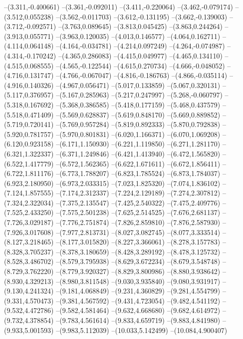 --(3.311,-0.400661)
--(3.361,-0.092011)
--(3.411,-0.220064)
--(3.462,-0.079174)
--(3.512,0.055238)
--(3.562,-0.011703)
--(3.612,-0.131195)
--(3.662,-0.139003)
--(3.712,-0.092571)
--(3.763,0.089645)
--(3.813,0.045425)
--(3.863,0.244264)
--(3.913,0.055771)
--(3.963,0.120035)
--(4.013,0.146577)
--(4.064,0.162711)
--(4.114,0.064148)
--(4.164,-0.034781)
--(4.214,0.097249)
--(4.264,-0.074987)
--(4.314,-0.170242)
--(4.365,0.286083)
--(4.415,0.049977)
--(4.465,0.134110)
--(4.515,0.068555)
--(4.565,-0.122544)
--(4.615,0.270734)
--(4.666,-0.048052)
--(4.716,0.131747)
--(4.766,-0.067047)
--(4.816,-0.186763)
--(4.866,-0.035114)
--(4.916,0.140326)
--(4.967,0.056471)
--(5.017,0.133859)
--(5.067,0.320131)
--(5.117,0.376957)
--(5.167,0.285963)
--(5.217,0.247997)
--(5.268,-0.060797)
--(5.318,0.167692)
--(5.368,0.386585)
--(5.418,0.177159)
--(5.468,0.437579)
--(5.518,0.471409)
--(5.569,0.628837)
--(5.619,0.848170)
--(5.669,0.889852)
--(5.719,0.720141)
--(5.769,0.957284)
--(5.819,0.892333)
--(5.870,0.792838)
--(5.920,0.781757)
--(5.970,0.801831)
--(6.020,1.166371)
--(6.070,1.069208)
--(6.120,0.923158)
--(6.171,1.150930)
--(6.221,1.119850)
--(6.271,1.281170)
--(6.321,1.322337)
--(6.371,1.249846)
--(6.421,1.413940)
--(6.472,1.565820)
--(6.522,1.417779)
--(6.572,1.562365)
--(6.622,1.671611)
--(6.672,1.856411)
--(6.722,1.811176)
--(6.773,1.788207)
--(6.823,1.785524)
--(6.873,1.784037)
--(6.923,2.180950)
--(6.973,2.033315)
--(7.023,1.825320)
--(7.074,1.836102)
--(7.124,1.857555)
--(7.174,2.312337)
--(7.224,2.129189)
--(7.274,2.307812)
--(7.324,2.322034)
--(7.375,2.135547)
--(7.425,2.540322)
--(7.475,2.409776)
--(7.525,2.433250)
--(7.575,2.501238)
--(7.625,2.514525)
--(7.676,2.681137)
--(7.726,3.029187)
--(7.776,2.751874)
--(7.826,2.859810)
--(7.876,2.587930)
--(7.926,3.017608)
--(7.977,2.813731)
--(8.027,3.082745)
--(8.077,3.333514)
--(8.127,3.218465)
--(8.177,3.015820)
--(8.227,3.366061)
--(8.278,3.157783)
--(8.328,3.705237)
--(8.378,3.180659)
--(8.428,3.289192)
--(8.478,3.125732)
--(8.528,3.486702)
--(8.579,3.795938)
--(8.629,3.672234)
--(8.679,3.548748)
--(8.729,3.762220)
--(8.779,3.920327)
--(8.829,3.800986)
--(8.880,3.938642)
--(8.930,4.329213)
--(8.980,3.811548)
--(9.030,3.935840)
--(9.080,3.931917)
--(9.130,4.241324)
--(9.181,4.068849)
--(9.231,4.360829)
--(9.281,4.554799)
--(9.331,4.570473)
--(9.381,4.567592)
--(9.431,4.723054)
--(9.482,4.541192)
--(9.532,4.472786)
--(9.582,4.581464)
--(9.632,4.668680)
--(9.682,4.614972)
--(9.732,4.378854)
--(9.783,4.561614)
--(9.833,4.659719)
--(9.883,4.841980)
--(9.933,5.001593)
--(9.983,5.112039)
--(10.033,5.142499)
--(10.084,4.900407)
